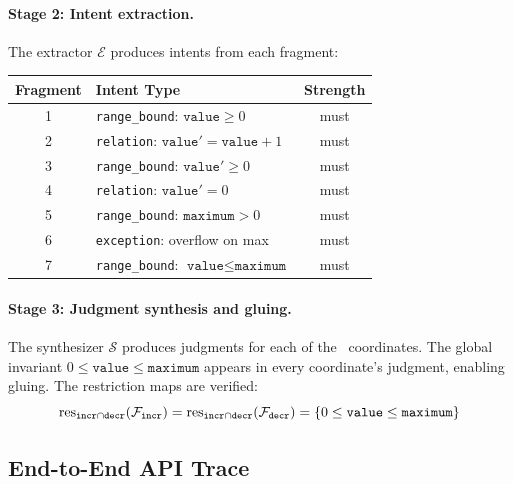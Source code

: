 \documentclass[11pt]{article}
\begin{document}
\paragraph{Stage 2: Intent extraction.}
The extractor $\mathcal{E}$ produces intents from each fragment:
\begin{center}
\begin{tabular}{clc}
\toprule
\textbf{Fragment} & \textbf{Intent Type} & \textbf{Strength} \\
\midrule
1 & \texttt{range\_bound}: $\texttt{value} \geq 0$ & \textsf{must} \\
2 & \texttt{relation}: $\texttt{value}' = \texttt{value} + 1$
  & \textsf{must} \\
3 & \texttt{range\_bound}: $\texttt{value}' \geq 0$ & \textsf{must} \\
4 & \texttt{relation}: $\texttt{value}' = 0$ & \textsf{must} \\
5 & \texttt{range\_bound}: $\texttt{maximum} > 0$ & \textsf{must} \\
6 & \texttt{exception}: overflow on max & \textsf{must} \\
7 & \texttt{range\_bound}: $\texttt{value} \leq \texttt{maximum}$
  & \textsf{must} \\
\bottomrule
\end{tabular}
\end{center}

\paragraph{Stage 3: Judgment synthesis and gluing.}
The synthesizer $\mathcal{S}$ produces judgments for each of the
\ppLXXnlcounterinvariantCoords\ coordinates.  The global invariant
$0 \leq \texttt{value} \leq \texttt{maximum}$ appears in every
coordinate's judgment, enabling gluing.  The restriction maps are
verified:
\[
\mathrm{res}_{\texttt{incr} \cap \texttt{decr}}(\mathcal{F}_{\texttt{incr}})
= \mathrm{res}_{\texttt{incr} \cap \texttt{decr}}(\mathcal{F}_{\texttt{decr}})
= \{0 \leq \texttt{value} \leq \texttt{maximum}\}
\]

\subsection{End-to-End API Trace}
\end{document}
